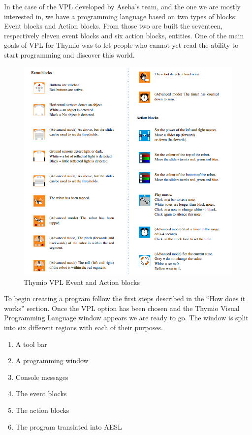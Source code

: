\documentclass{scrartcl}
\begin{document}
In the case of the VPL developed by Aseba’s team, and the one we are mostly interested in, we have a programming language based on two types of blocks: Event blocks and Action blocks. 
From those two are built the seventeen, respectively eleven event blocks and six action blocks, entities. 
One of the main goals of VPL for Thymio was to let people who cannot yet read the ability to start programming and discover this world.

\begin{figure}[h!]
  \includegraphics[width=\textwidth]{Thymio_blocks}
  \caption{Thymio VPL Event and Action blocks}
  \label{fig:thymio_vpl_blocks}
\end{figure}

To begin creating a program follow the first steps described in the “How does it works” section. 
Once the VPL option has been chosen and the Thymio Visual Programming Language window appears we are ready to go. 
The window is split into six different regions with each of their purposes.
\begin{enumerate}
  \item A tool bar
  \item A programming window
  \item Console messages
  \item The event blocks
  \item The action blocks
  \item The program translated into AESL
\end{enumerate}
\end{document}
